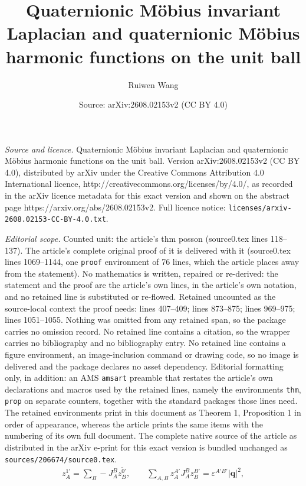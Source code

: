 \documentclass[10pt,a4paper]{amsart}
\title{Quaternionic M\"{o}bius invariant Laplacian and quaternionic M\"{o}bius harmonic functions on the unit ball}
\author{Ruiwen Wang}
\date{Source: arXiv:2608.02153v2 (CC BY 4.0)}
\begin{document}
\maketitle

\noindent\emph{Source and licence.} Quaternionic M\"{o}bius invariant Laplacian and quaternionic M\"{o}bius harmonic functions on the unit ball. Version arXiv:2608.02153v2 (CC BY 4.0), distributed by arXiv under the Creative Commons Attribution 4.0 International licence, http://creativecommons.org/licenses/by/4.0/, as recorded in the arXiv licence metadata for this exact version and shown on the abstract page https://arxiv.org/abs/2608.02153v2. Full licence notice: \texttt{licenses/arxiv-2608.02153-CC-BY-4.0.txt}.\par\smallskip

\noindent\textit{Editorial scope.} Counted unit: the article's thm posson (source0.tex lines 118--137). The article's complete original proof of it is delivered with it (source0.tex lines 1069--1144, one \texttt{proof} environment of 76 lines, which the article places away from the statement). No mathematics is written, repaired or re-derived: the statement and the proof are the article's own lines, in the article's own notation, and no retained line is substituted or re-flowed.  Retained uncounted as the source-local context the proof needs: lines 407--409; lines 873--875; lines 969--975; lines 1051--1055.  Nothing was omitted from any retained span, so the package carries no omission record.  No retained line contains a citation, so the wrapper carries no bibliography and no bibliography entry.  No retained line contains a figure environment, an image-inclusion command or drawing code, so no image is delivered and the package declares no asset dependency.  Editorial formatting only, in addition: an AMS \texttt{amsart} preamble that restates the article's own declarations and macros used by the retained lines, namely the environments \texttt{thm}, \texttt{prop} on separate counters, together with the standard packages those lines need.  The retained environments print in this document as Theorem 1, Proposition 1 in order of appearance, whereas the article prints the same items with the numbering of its own full document.  The complete native source of the article as distributed in the arXiv e-print for this exact version is bundled unchanged as \texttt{sources/206674/source0.tex}.
\begin{equation}\begin{aligned}\label{z jab}
z_A^{1'}=\sum_B-J_A^B\overline{z_B^{0'}},\qquad\sum_{A,B}z_A^{A'}J_A^Bz_B^{B'}=\varepsilon^{A'B'}|\mathbf{q}|^2,
\end{aligned}\end{equation}
\end{document}
